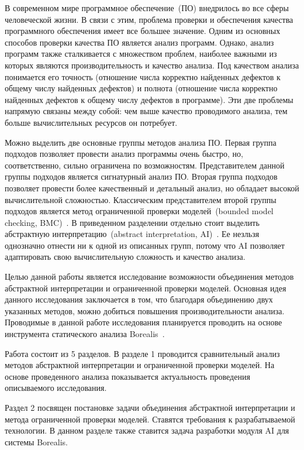\intro
В современном мире программное обеспечение~(ПО) внедрилось во все сферы 
человеческой жизни. В связи с этим, проблема проверки и обеспечения качества 
программного обеспечения имеет все большее значение. Одним из основных способов 
проверки качества ПО является анализ программ. Однако, анализ программ также 
сталкивается с множеством проблем, наиболее важными из которых являются 
производительность и качество анализа. Под качеством анализа понимается его 
точность (отношение числа корректно найденных дефектов к общему числу найденных 
дефектов) и полнота (отношение числа корректно найденных дефектов к общему 
числу дефектов в программе). Эти две проблемы напрямую связаны между собой:
чем выше качество проводимого анализа, тем больше вычислительных ресурсов он 
потребует.

Можно выделить две основные группы методов анализа ПО. Первая группа подходов 
позволяет провести анализ программы очень быстро, но, соответственно, сильно
ограничена по возможностям. Представителем данной группы подходов является 
сигнатурный анализ ПО. Вторая группа подходов позволяет провести более 
качественный и детальный анализ, но обладает высокой вычислительной сложностью.
Классическим представителем второй группы подходов является метод ограниченной 
проверки моделей~(bounded model checking, BMC)~\cite{bmc}. В приведенном 
разделении отдельно стоит выделить абстрактную интерпретацию~(abstract 
interpretation, AI)~\cite{ai}. Ее незльзя однозначно отнести ни к одной 
из описанных групп, потому что AI позволяет адаптировать свою вычислительную 
сложность и качество анализа.

Целью данной работы является исследование возможности объединения методов 
абстрактной интерпретации и ограниченной проверки моделей. Основная идея 
данного исследования заключается в том, что благодаря объединению двух 
указанных методов, можно добиться повышения производительности анализа. 
Проводимые в данной работе исследования планируется проводить на основе 
инструмента статического анализа Borealis~\cite{borealis}.

Работа состоит из 5 разделов. В разделе 1 проводится сравнительный анализ 
методов абстрактной интерпретации и ограниченной проверки моделей. На основе 
проведенного анализа показывается актуальность проведения описываемого 
исследования.

Раздел 2 посвящен постановке задачи объединения абстрактной интерпретации и
метода ограниченной проверки моделей. Ставятся требования к разрабатываемой 
технологии. В данном разделе также ставится задача разработки модуля AI для
системы Borealis.

